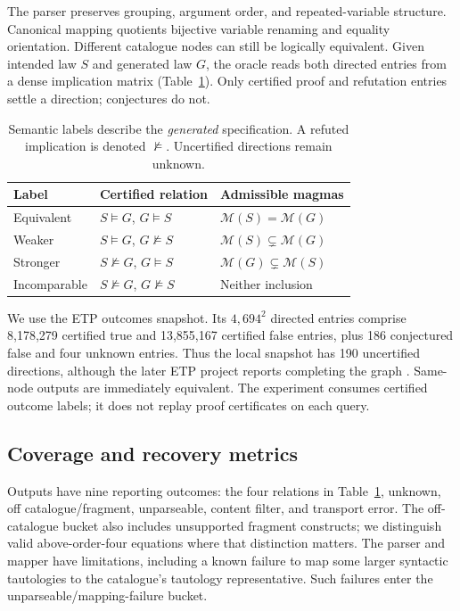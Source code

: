 \documentclass{article}
\newcommand{\code}[1]{\texttt{\detokenize{#1}}}
\begin{document}
The parser preserves grouping, argument order, and repeated-variable structure.
Canonical mapping quotients bijective variable renaming and equality orientation.
Different catalogue nodes can still be logically equivalent. Given intended law
$S$ and generated law $G$, the oracle reads both directed entries from a dense
implication matrix (Table~\ref{tab:relations}). Only certified proof and
refutation entries settle a direction; conjectures do not.

\begin{table}[t]
\centering
\caption{Semantic labels describe the \emph{generated} specification. A refuted
implication is denoted $\not\models$. Uncertified directions remain unknown.}
\label{tab:relations}
\begin{tabular}{lll}
\toprule
Label & Certified relation & Admissible magmas \\
\midrule
Equivalent & $S\models G$, $G\models S$ & $\mathcal{M}(S)=\mathcal{M}(G)$ \\
Weaker & $S\models G$, $G\not\models S$ & $\mathcal{M}(S)\subsetneq\mathcal{M}(G)$ \\
Stronger & $S\not\models G$, $G\models S$ & $\mathcal{M}(G)\subsetneq\mathcal{M}(S)$ \\
Incomparable & $S\not\models G$, $G\not\models S$ & Neither inclusion \\
\bottomrule
\end{tabular}
\end{table}

We use the \code{2024-11-10} ETP outcomes snapshot. Its $4,694^2$ directed
entries comprise 8,178,279 certified true and 13,855,167 certified false entries,
plus 186 conjectured false and four unknown entries. Thus the local snapshot has
190 uncertified directions, although the later ETP project reports completing
the graph \citep{bolan2025etp}. Same-node outputs are immediately equivalent.
The experiment consumes certified outcome labels; it does not replay proof
certificates on each query.

\subsection{Coverage and recovery metrics}

Outputs have nine reporting outcomes: the four relations in
Table~\ref{tab:relations}, unknown, off catalogue/fragment, unparseable, content
filter, and transport error. The off-catalogue bucket also includes unsupported
fragment constructs; we distinguish valid above-order-four equations where that
distinction matters. The parser and mapper have limitations, including a known
failure to map some larger syntactic tautologies to the catalogue's tautology
representative. Such failures enter the unparseable/mapping-failure bucket.
\end{document}
